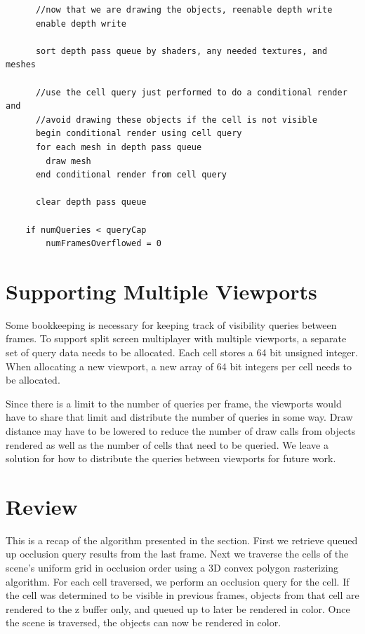 \documentclass[12pt]{ucthesis}
\begin{document}
\begin{lstlisting}
      //now that we are drawing the objects, reenable depth write
      enable depth write

      sort depth pass queue by shaders, any needed textures, and meshes

      //use the cell query just performed to do a conditional render and
      //avoid drawing these objects if the cell is not visible
      begin conditional render using cell query
      for each mesh in depth pass queue
        draw mesh
      end conditional render from cell query

      clear depth pass queue
      
    if numQueries < queryCap
    	numFramesOverflowed = 0
\end{lstlisting}

\section{Supporting Multiple Viewports}
\label{supporting-multiple-viewports}

Some bookkeeping is necessary for keeping track of visibility queries between frames.
To support split screen multiplayer with multiple viewports, a separate set of query data needs to be allocated.
Each cell stores a 64 bit unsigned integer.
When allocating a new viewport, a new array of 64 bit integers per cell needs to be allocated.

Since there is a limit to the number of queries per frame, the viewports would have to share that limit and distribute the number of queries in some way.
Draw distance may have to be lowered to reduce the number of draw calls from objects rendered as well as the number of cells that need to be queried.
We leave a solution for how to distribute the queries between viewports for future work.

\section{Review}
\label{review}

This is a recap of the algorithm presented in the section.
First we retrieve queued up occlusion query results from the last frame.
Next we traverse the cells of the scene's uniform grid in occlusion order using a 3D convex polygon rasterizing algorithm.
For each cell traversed, we perform an occlusion query for the cell.
If the cell was determined to be visible in previous frames, objects from that cell are rendered to the z buffer only, and queued up to later be rendered in color.
Once the scene is traversed, the objects can now be rendered in color.
\end{document}
